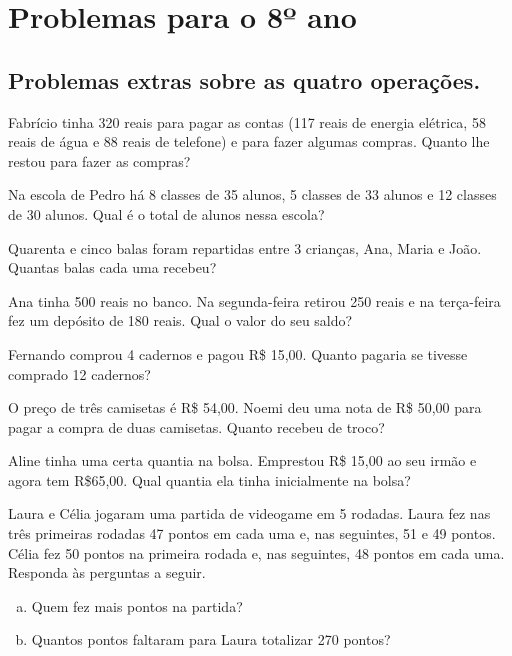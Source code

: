 \chapter{Problemas para o 8º ano}
\section{Problemas extras sobre as quatro operações.}
	
    \item Fabrício tinha 320 reais para pagar as contas (117 reais de energia elétrica, 58 reais de água e 88 reais de telefone) e para fazer algumas compras. Quanto lhe restou para fazer as compras?
     
    \item Na escola de Pedro há 8 classes de 35 alunos, 5 classes de 33 alunos e 12 classes de 30 alunos. Qual é o total de alunos nessa escola?
     
    \item Quarenta e cinco balas foram repartidas entre 3 crianças, Ana, Maria e João. Quantas balas cada uma recebeu?
     
    \item Ana tinha 500 reais no banco. Na segunda-feira retirou 250 reais e na terça-feira fez um depósito de 180 reais. Qual o valor do seu saldo?
     
    \item Fernando comprou 4 cadernos e pagou R\$ 15,00. Quanto pagaria se tivesse comprado 12 cadernos?
     
    \item O preço de três camisetas é R\$ 54,00. Noemi deu uma nota de R\$ 50,00 para pagar a compra de duas camisetas. Quanto recebeu de troco?
     
    \item Aline tinha uma certa quantia na bolsa. Emprestou R\$ 15,00 ao seu irmão e agora tem R\$65,00. Qual quantia ela tinha inicialmente na bolsa?
     
    \item Laura e Célia jogaram uma partida de videogame em 5 rodadas. Laura fez nas três primeiras rodadas 47 pontos em cada uma e, nas seguintes, 51 e 49 pontos. Célia fez 50 pontos na primeira rodada e, nas seguintes, 48 pontos em cada uma. Responda às perguntas a seguir.
	\begin{enumerate}[a)]
    	\item Quem fez mais pontos na partida?
    	\item Quantos pontos faltaram para Laura totalizar 270 pontos?
	\end{enumerate}      
	
